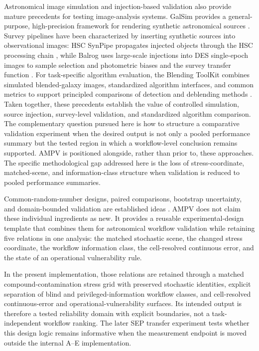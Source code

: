 Astronomical image simulation and injection-based validation also
provide mature precedents for testing image-analysis systems. GalSim
provides a general-purpose, high-precision framework for rendering
synthetic astronomical sources \cite{ref8}. Survey pipelines have been
characterized by inserting synthetic sources into observational images:
HSC SynPipe propagates injected objects through the HSC processing chain
\cite{ref2}, while Balrog uses large-scale injections into DES
single-epoch images to sample selection and photometric biases and the
survey transfer function \cite{ref9}. For task-specific algorithm
evaluation, the Blending ToolKit combines simulated blended-galaxy
images, standardized algorithm interfaces, and common metrics to support
principled comparisons of detection and deblending methods \cite{ref10}.
Taken together, these precedents establish the value of controlled
simulation, source injection, survey-level validation, and standardized
algorithm comparison. The complementary question pursued here is how to
structure a comparative validation experiment when the desired output is
not only a pooled performance summary but the tested region in which a
workflow-level conclusion remains supported. AMPV is positioned
alongside, rather than prior to, these approaches. The specific
methodological gap addressed here is the loss of stress-coordinate,
matched-scene, and information-class structure when validation is
reduced to pooled performance summaries.

Common-random-number designs, paired comparisons, bootstrap uncertainty,
and domain-bounded validation are established ideas \cite{ref6,ref7}.
AMPV does not claim these individual ingredients as new. It provides a
reusable experimental-design template that combines them for astronomical
workflow validation while retaining five relations in one analysis: the
matched stochastic scene, the changed stress coordinate, the workflow
information class, the cell-resolved continuous error, and the state of
an operational vulnerability rule.

In the present implementation, those relations are retained through a
matched compound-contamination stress grid with preserved stochastic
identities, explicit separation of blind and privileged-information
workflow classes, and cell-resolved continuous-error and
operational-vulnerability surfaces. Its intended output is therefore a
tested reliability domain with explicit boundaries, not a task-independent
workflow ranking. The later SEP transfer experiment tests whether this
design logic remains informative when the measurement endpoint is moved
outside the internal A--E implementation.

